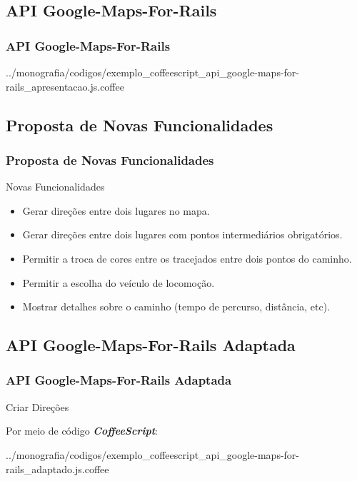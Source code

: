 \subsection{API Google-Maps-For-Rails}
\begin{frame}
 \frametitle{API Google-Maps-For-Rails}

      
      {../monografia/codigos/exemplo_coffeescript_api_google-maps-for-rails_apresentacao.js.coffee}

\end{frame}


 \subsection{Proposta de Novas Funcionalidades}
\begin{frame}
 \frametitle{Proposta de Novas Funcionalidades}

  \begin{block}{Novas Funcionalidades}   

   \begin{itemize}

    \item  Gerar direções entre dois lugares no mapa.    

    \item  Gerar direções entre dois lugares com pontos intermediários obrigatórios.

    \item  Permitir a troca de cores entre os tracejados entre dois pontos do caminho.
    
    \item  Permitir a escolha do veículo de locomoção.    
    
    \item  Mostrar detalhes sobre o caminho (tempo de percurso, distância, etc).

   \end{itemize}

  \end{block}

\end{frame}


\subsection{API Google-Maps-For-Rails Adaptada}
\begin{frame}
 \frametitle{API Google-Maps-For-Rails Adaptada}

  \begin{block}{Criar Direções}

   Por meio de código \emph{\textbf{CoffeeScript}}:

      
      {../monografia/codigos/exemplo_coffeescript_api_google-maps-for-rails_adaptado.js.coffee}

  \end{block}

\end{frame}
